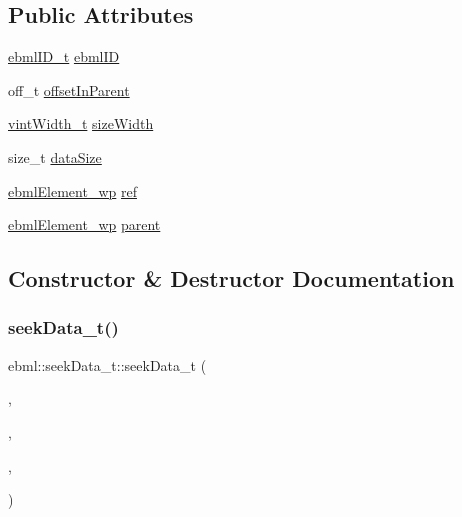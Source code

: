 \subsection*{Public Attributes}
\begin{DoxyCompactItemize}
\item 
\mbox{\hyperlink{namespaceebml_a86c5f604ddf12a74aa9812e997a58691}{ebml\+I\+D\+\_\+t}} \mbox{\hyperlink{classebml_1_1seekData__t_aeebc9c60a3157c2e8963dff000016111}{ebml\+ID}}
\item 
off\+\_\+t \mbox{\hyperlink{classebml_1_1seekData__t_a0c34ad1abeed44ddb521abac8dfe107a}{offset\+In\+Parent}}
\item 
\mbox{\hyperlink{namespaceebml_a2ccdfb60b23efb51fe07f9d066e23604}{vint\+Width\+\_\+t}} \mbox{\hyperlink{classebml_1_1seekData__t_aaebccafee18298ba365b784acbc6df6b}{size\+Width}}
\item 
size\+\_\+t \mbox{\hyperlink{classebml_1_1seekData__t_a0a25256a0cd61d4077bb37e064198125}{data\+Size}}
\item 
\mbox{\hyperlink{namespaceebml_a495fb58b42b0050d887415351af02935}{ebml\+Element\+\_\+wp}} \mbox{\hyperlink{classebml_1_1seekData__t_af9e91ea27623cf9d36ef45f8202e4f46}{ref}}
\item 
\mbox{\hyperlink{namespaceebml_a495fb58b42b0050d887415351af02935}{ebml\+Element\+\_\+wp}} \mbox{\hyperlink{classebml_1_1seekData__t_aa2137b3e5ee53c2e90754fa44f81f2ef}{parent}}
\end{DoxyCompactItemize}


\subsection{Constructor \& Destructor Documentation}
\mbox{\label{classebml_1_1seekData__t_a080c97211758dcec4045e5e08427cdb1}} 
\subsubsection{\texorpdfstring{seek\+Data\+\_\+t()}{seekData\_t()}\hspace{0.1cm}{\footnotesize\ttfamily [1/5]}}
{\footnotesize\ttfamily ebml\+::seek\+Data\+\_\+t\+::seek\+Data\+\_\+t (\begin{DoxyParamCaption}\item[{\mbox{\hyperlink{namespaceebml_a86c5f604ddf12a74aa9812e997a58691}{ebml\+I\+D\+\_\+t}}}]{,  }\item[{off\+\_\+t}]{,  }\item[{\mbox{\hyperlink{namespaceebml_a2ccdfb60b23efb51fe07f9d066e23604}{vint\+Width\+\_\+t}}}]{,  }\item[{size\+\_\+t}]{ }\end{DoxyParamCaption})}

